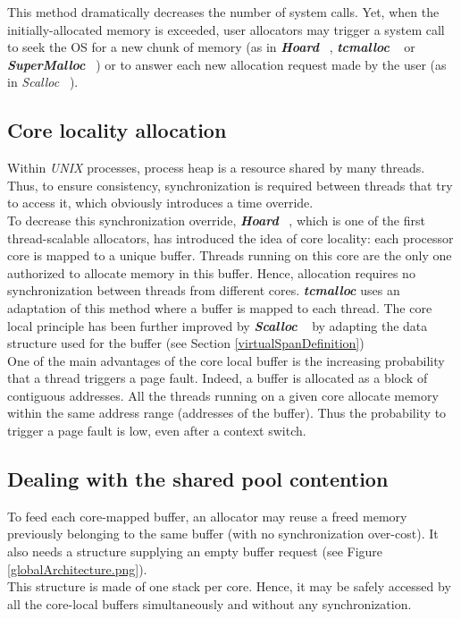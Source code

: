 \documentclass[10pt]{article}											%
\begin{document}
This method dramatically decreases the number of system calls.  Yet, when the initially-allocated memory is exceeded, user allocators may trigger a system call to seek the OS for a new chunk of memory (as in \textbf{\textit{Hoard}} ~\cite{hoard_berger}, \textit{\textbf{tcmalloc}} ~\cite{tcmalloc_ghemawat} or \textbf{\textit{SuperMalloc}} ~\cite{supermalloc_kuszmaul}) or to answer each new allocation request made by the user (as in \textit{Scalloc} ~\cite{scalloc_aigner}).



\subsection{Core locality allocation}
Within \textit{UNIX} processes, process heap is a resource shared by many threads.   Thus, to ensure consistency, synchronization is required between threads that try to access it, which obviously introduces a time override.\\

To decrease this synchronization override, \textbf{\textit{Hoard}} ~\cite{hoard_berger}, which is one of the first thread-scalable allocators, has introduced the idea of core locality:  each processor core is mapped to a unique buffer. Threads running on this core are the only one authorized to allocate memory in this buffer. Hence, allocation requires no synchronization between threads from different cores.   \textbf{\textit{tcmalloc}} uses an adaptation of this method where a buffer is mapped to each thread.   The core local principle has been further improved by \textbf{\textit{Scalloc}} ~\cite{scalloc_aigner} by adapting the data structure used for the buffer (see Section \ref{virtualSpanDefinition})\\

One of the main advantages of the core local buffer is the increasing probability that a thread triggers a page fault.   Indeed, a buffer is allocated as a block of contiguous addresses.   All the threads running on a given core allocate memory within the same address range (addresses of the buffer).   Thus the probability to trigger a page fault is low, even after a context switch.



\subsection{Dealing with the shared pool contention}
To feed each core-mapped buffer, an allocator may reuse a freed memory previously belonging to the same buffer (with no synchronization over-cost).   It also needs a structure supplying an empty buffer request (see Figure \ref{globalArchitecture.png}).\\
This structure is made of one stack per core.  Hence, it may be safely accessed by all the core-local buffers simultaneously and without any synchronization.\\
\end{document}
